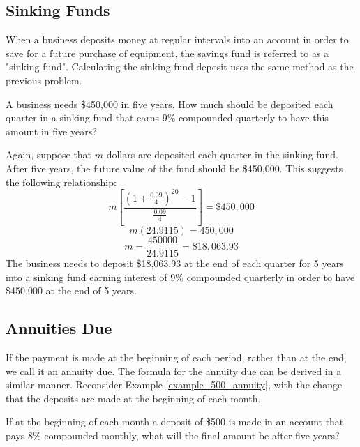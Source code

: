 \subsection{Sinking Funds}

When a business deposits money at regular intervals into an account in order to save for a future purchase of equipment, the savings fund is referred to as a "sinking fund". Calculating the sinking fund deposit uses the same method as the previous problem.


\begin{example}
    A business needs \$450,000 in five years. How much should be deposited each quarter in a sinking fund that earns 9\% compounded quarterly to have this amount in five years?
\end{example}

\begin{solution}
    Again, suppose that \( m \) dollars are deposited each quarter in the sinking fund. After five years, the future value of the fund should be \$450,000. This suggests the following relationship:
    \[ m \left[ \frac{(1 + \frac{0.09}{4})^{20} - 1}{\frac{0.09}{4}} \right] = \$450,000 \]
    \[ m (24.9115) = 450,000 \]
    \[ m = \frac{450000}{24.9115} = \$18,063.93 \]
    The business needs to deposit \$18,063.93 at the end of each quarter for 5 years into a sinking fund earning interest of 9\% compounded quarterly in order to have \$450,000 at the end of 5 years.
\end{solution}

\subsection{Annuities Due}

If the payment is made at the beginning of each period, rather than at the end, we call it an annuity due. The formula for the annuity due can be derived in a similar manner. Reconsider Example \ref{example_500_annuity}, with the change that the deposits are made at the beginning of each month.

\begin{example}
    If at the beginning of each month a deposit of \$500 is made in an account that pays 8\% compounded monthly, what will the final amount be after five years?
\end{example}

